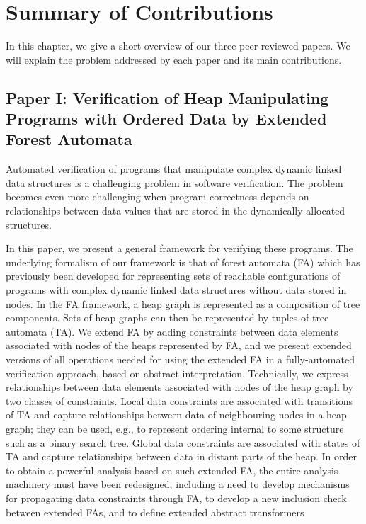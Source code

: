 \chapter{Summary of Contributions}

In this chapter, we give a short overview of our three peer-reviewed papers. We
will explain the problem addressed by each paper and its main contributions.
\section{Paper I: Verification of Heap Manipulating Programs with Ordered Data by Extended Forest Automata}   

Automated verification of programs that manipulate complex dynamic linked data structures is a challenging problem in software verification. The problem becomes even more challenging when program correctness depends on relationships between data values that are stored in the dynamically allocated structures. 

In this paper, we present a general framework for verifying these programs. The underlying formalism of our framework is that
of forest automata (FA) which
has previously been developed for representing sets of reachable configurations of programs with complex dynamic linked data structures without data stored in nodes. In the FA framework, a heap
graph is represented as a composition of tree components. Sets of heap graphs can then
be represented by tuples of tree automata (TA). We extend FA by adding constraints between data elements associated with nodes of the heaps represented by FA, and we present extended versions of all operations needed for using the extended FA in a fully-automated verification approach, based on abstract interpretation.  
Technically, we express relationships between data elements associated with nodes of the heap graph by two classes of constraints. Local data constraints are associated with transitions of TA and capture relationships between data of neighbouring nodes in a heap graph; they
can be used, e.g., to represent ordering internal to some structure such as a binary search
tree. Global data constraints are associated with states of TA and capture relationships
between data in distant parts of the heap. In order to obtain a powerful analysis based on
such extended FA, the entire analysis machinery must have been redesigned, including
a need to develop mechanisms for propagating data constraints through FA, to develop a new inclusion check between
extended FAs, and to define extended abstract transformers

